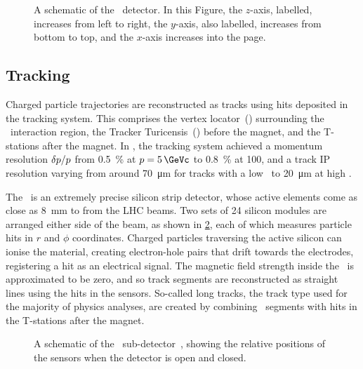 \begin{figure}
  \centering
  
  \caption{%
    A schematic of the \lhcb\ detector.
    In this Figure, the $z$-axis, labelled, increases from left to right, the 
    $y$-axis, also labelled, increases from bottom to top, and the $x$-axis 
    increases into the page.
  }
  \label{fig:intro:lhcb:detector}
\end{figure}

\subsection{Tracking}
\label{chap:intro:lhcb:detector:tracking}

Charged particle trajectories are reconstructed as tracks using hits deposited 
in the tracking system.
This comprises the vertex locator~(\velo) surrounding the \pp\ interaction 
region, the Tracker Turicensis~(\ttracker) before the magnet, and the 
T-stations after the magnet.
In \runone, the tracking system achieved a momentum resolution 
$\delta{\ensuremath{p}}/p$ from \SI{0.5}{\percent} at $\ptot = \SI{5}{\GeVc}$ to 
\SI{0.8}{\percent} at \SI{100}{\GeVc}, and a track \acl{IP} resolution varying 
from around \SI{70}{\micro\metre} for tracks with a low \pT\ to 
\SI{20}{\micro\metre} at high \pT.

The \velo\ is an extremely precise silicon strip detector, whose active 
elements come as close as \SI{8}{\milli\metre} to from the \ac{LHC} beams.
Two sets of 24 silicon modules are arranged either side of the beam, as shown 
in \cref{fig:intro:lhcb:velo}, each of which measures particle hits in $r$ and 
$\phi$ coordinates.
Charged particles traversing the active silicon can ionise the material, 
creating electron-hole pairs that drift towards the electrodes, registering a 
hit as an electrical signal.
The magnetic field strength inside the \velo\ is approximated to be zero, and 
so track segments are reconstructed as straight lines using the hits in the 
sensors.
So-called long tracks, the track type used for the majority of physics 
analyses, are created by combining \velo\ segments with hits in the T-stations 
after the magnet.

\begin{figure}
  \centering
  
  \caption{%
    A schematic of the \velo\ sub-detector~\cite{Alves:2008zz}, showing the
    relative positions of the sensors when the detector is open and closed.
  }
  \label{fig:intro:lhcb:velo}
\end{figure}

